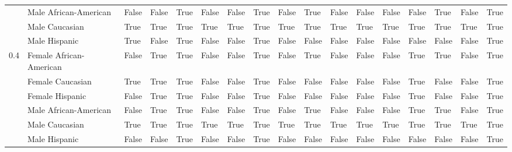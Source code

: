 \begin{tabular}{lllllllllllllllll}
    & Male African-American &       False &           False &        True &         False &       False &           True &               False &        True &       False &                  False &                False &       False &        True &          False &              True \\
    & Male Caucasian &        True &            True &        True &          True &        True &           True &                True &        True &        True &                   True &                 True &        True &        True &           True &              True \\
    & Male Hispanic &        True &           False &        True &         False &       False &           True &               False &       False &       False &                  False &                False &       False &       False &          False &              True \\
0.4 & Female African-American &       False &            True &        True &         False &       False &           True &               False &        True &       False &                  False &                False &        True &        True &          False &              True \\
    & Female Caucasian &        True &            True &        True &         False &       False &           True &               False &       False &       False &                  False &                False &        True &       False &          False &              True \\
    & Female Hispanic &       False &            True &        True &         False &       False &           True &               False &       False &       False &                  False &                False &        True &       False &          False &              True \\
    & Male African-American &       False &            True &        True &         False &       False &           True &               False &        True &       False &                  False &                False &        True &        True &          False &              True \\
    & Male Caucasian &        True &            True &        True &          True &        True &           True &                True &        True &        True &                   True &                 True &        True &        True &           True &              True \\
    & Male Hispanic &       False &           False &        True &         False &       False &           True &               False &       False &       False &                  False &                False &       False &       False &          False &              True \\
\bottomrule
\end{tabular}
